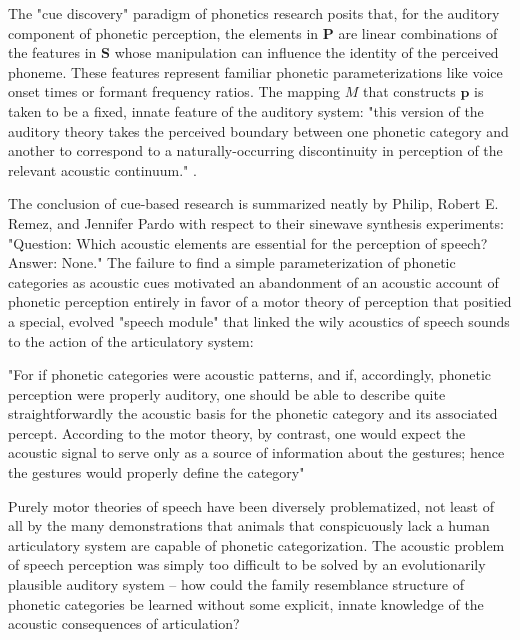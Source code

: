 The "cue discovery" paradigm of phonetics research posits that, for the auditory component of phonetic perception, the elements in $\mathbf{P}$ are linear combinations of the features in $\mathbf{S}$ whose manipulation can influence the identity of the perceived phoneme. These features represent familiar phonetic parameterizations like voice onset times or formant frequency ratios. The mapping $M$ that constructs $\mathbf{p}$ is taken to be a fixed, innate feature of the auditory system: "this version of the auditory theory takes the perceived boundary between one phonetic category and another to correspond to a naturally-occurring discontinuity in perception of the relevant acoustic continuum." \citep{Liberman1985a}. 

The conclusion of cue-based research is summarized neatly by Philip, Robert E. Remez, and Jennifer Pardo with respect to their sinewave synthesis experiments: "Question: Which acoustic elements are essential for the perception of speech? Answer: None\citep{HaskinsLaboratories2020}." The failure to find a simple parameterization of phonetic categories as acoustic cues motivated an abandonment of an acoustic account of phonetic perception entirely in favor of a motor theory of perception that positied a special, evolved "speech module" that linked the wily acoustics of speech sounds to the action of the articulatory system:

\begin{leftbar}
"For if phonetic categories were acoustic patterns, and if, accordingly, phonetic perception were properly auditory, one should be able to describe quite straightforwardly the acoustic basis for the phonetic category and its associated percept. According to the motor theory, by contrast, one would expect the acoustic signal to serve only as a source of information about the gestures; hence the gestures would properly define the category"
\citep{Liberman1985a}
\end{leftbar}

Purely motor theories of speech have been diversely problematized, not least of all by the many demonstrations that animals that conspicuously lack a human articulatory system are capable of phonetic categorization\citep{Carbonell2014,Lotto1997,Kluender2000}. The acoustic problem of speech perception was simply too difficult to be solved by an evolutionarily plausible auditory system -- how could the family resemblance structure of phonetic categories be learned without some explicit, innate knowledge of the acoustic consequences of articulation?\citep{Bailey1980} 

